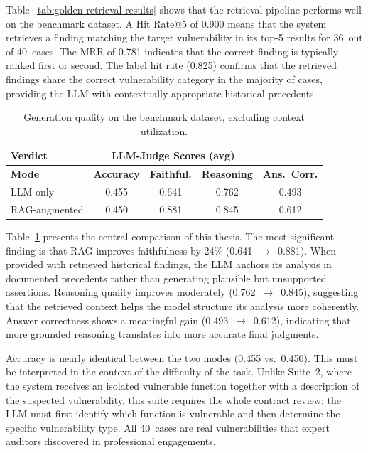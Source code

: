 Table~\ref{tab:golden-retrieval-results} shows that the retrieval pipeline performs well on the benchmark dataset. A Hit Rate@5 of 0.900 means that the system retrieves a finding matching the target vulnerability in its top-5 results for 36~out of 40~cases. The MRR of 0.781 indicates that the correct finding is typically ranked first or second. The label hit rate (0.825) confirms that the retrieved findings share the correct vulnerability category in the majority of cases, providing the LLM with contextually appropriate historical precedents.

\begin{table}[!ht]
\centering
\small
\renewcommand{\arraystretch}{1.3}
\begin{tabular*}{\textwidth}{@{\extracolsep{\fill}} lcccc}
\toprule
\textbf{Verdict} & \multicolumn{3}{c}{\textbf{LLM-Judge Scores (avg)}} \\
\midrule
\textbf{Mode} & \textbf{Accuracy} & \textbf{Faithful.} & \textbf{Reasoning} & \textbf{Ans.\ Corr.} \\
\midrule
LLM-only & 0.455 & 0.641 & 0.762   & 0.493 \\
RAG-augmented & 0.450 & 0.881 & 0.845 & 0.612 \\
\bottomrule
\end{tabular*}
\caption[Generation quality on the benchmark dataset.]{Generation quality on the benchmark dataset, excluding context utilization.}
\label{tab:golden-generation-results}
\end{table}

Table~\ref{tab:golden-generation-results} presents the central comparison of this thesis. The most significant finding is that RAG improves faithfulness by 24\% (0.641~$\to$~0.881). When provided with retrieved historical findings, the LLM anchors its analysis in documented precedents rather than generating plausible but unsupported assertions. Reasoning quality improves moderately (0.762~$\to$~0.845), suggesting that the retrieved context helps the model structure its analysis more coherently. Answer correctness shows a meaningful gain (0.493~$\to$~0.612), indicating that more grounded reasoning translates into more accurate final judgments.

Accuracy is nearly identical between the two modes (0.455 vs.\ 0.450). This must be interpreted in the context of the difficulty of the task. Unlike Suite~2, where the system receives an isolated vulnerable function together with a description of the suspected vulnerability, this suite requires the whole contract review: the LLM must first identify which function is vulnerable and then determine the specific vulnerability type. All 40~cases are real vulnerabilities that expert auditors discovered in professional engagements.

